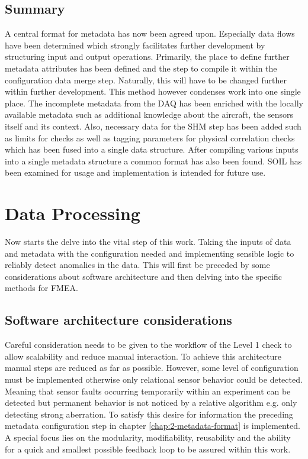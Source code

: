 \subsection{Summary}
A central format for metadata has now been agreed upon. Especially data flows have been determined which strongly facilitates further development by structuring input and output operations. Primarily, the place to define further metadata attributes has been defined and the step to compile it within the configuration data merge step. Naturally, this will have to be changed further within further development. This method however condenses work into one single place.
The incomplete metadata from the DAQ has been enriched with the locally available metadata such as additional knowledge about the aircraft, the sensors itself and its context. Also, necessary data for the SHM step has been added such as limits for checks as well as tagging parameters for physical correlation checks which has been fused into a single data structure.
After compiling various inputs into a single metadata structure a common format has also been found. SOIL has been examined for usage and implementation is intended for future use.

\newpage


\section{Data Processing}
Now starts the delve into the vital step of this work. Taking the inputs of data and metadata with the configuration needed and implementing sensible logic to reliably detect anomalies in the data. This will first be preceded by some considerations about software architecture and then delving into the specific methods for FMEA.

\subsection{Software architecture considerations}


Careful consideration needs to be given to the workflow of the Level 1 check to allow scalability and reduce manual interaction. To achieve this architecture manual steps are reduced as far as possible. However, some level of configuration must be implemented otherwise only relational sensor behavior could be detected. Meaning that sensor faults occurring temporarily within an experiment can be detected but permanent behavior is not noticed by a relative algorithm e.g. only detecting strong aberration. To satisfy this desire for information the preceding metadata configuration step in chapter \ref{chap:2-metadata-format} is implemented. A special focus lies on the modularity, modifiability, reusability and the ability for a quick and smallest possible feedback loop to be assured within this work.

